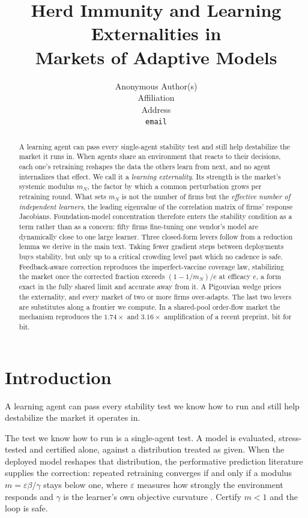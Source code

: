 \documentclass{article}
\title{Herd Immunity and Learning Externalities in\\ Markets of Adaptive Models}
\author{%
  Anonymous Author(s) \\
  Affiliation \\
  Address \\
  \texttt{email} \\
}
\theoremstyle{plain}
\theoremstyle{definition}
\newcommand{\mN}{m_N}
\begin{document}
\maketitle

\begin{abstract}
A learning agent can pass every single-agent stability test and still help destabilize the market it runs in. When agents share an environment that reacts to their decisions, each one's retraining reshapes the data the others learn from next, and no agent internalizes that effect. We call it a \emph{learning externality}. Its strength is the market's systemic modulus $\mN$, the factor by which a common perturbation grows per retraining round. What sets $\mN$ is not the number of firms but the \emph{effective number of independent learners}, the leading eigenvalue of the correlation matrix of firms' response Jacobians. Foundation-model concentration therefore enters the stability condition as a term rather than as a concern: fifty firms fine-tuning one vendor's model are dynamically close to one large learner. Three closed-form levers follow from a reduction lemma we derive in the main text. Taking fewer gradient steps between deployments buys stability, but only up to a critical crowding level past which no cadence is safe. Feedback-aware correction reproduces the imperfect-vaccine coverage law, stabilizing the market once the corrected fraction exceeds $(1-1/\mN)/e$ at efficacy $e$, a form exact in the fully shared limit and accurate away from it. A Pigouvian wedge prices the externality, and every market of two or more firms over-adapts. The last two levers are substitutes along a frontier we compute. In a shared-pool order-flow market the mechanism reproduces the $1.74\times$ and $3.16\times$ amplification of a recent preprint, bit for bit.
\end{abstract}

\section{Introduction}

A learning agent can pass every stability test we know how to run and still help destabilize the market it operates in.

The test we know how to run is a single-agent test. A model is evaluated, stress-tested and certified alone, against a distribution treated as given. When the deployed model reshapes that distribution, the performative prediction literature supplies the correction: repeated retraining converges if and only if a modulus $m = \varepsilon\beta/\gamma$ stays below one, where $\varepsilon$ measures how strongly the environment responds and $\gamma$ is the learner's own objective curvature \citep{perdomo2020}. Certify $m<1$ and the loop is safe.
\end{document}
